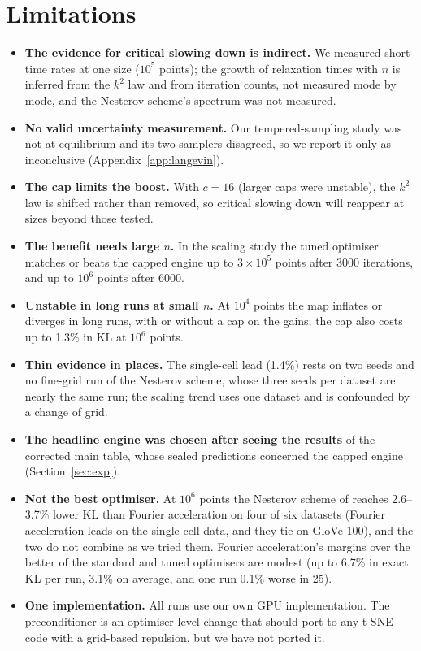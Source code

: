 \documentclass[11pt]{article}
\begin{document}
\section{Limitations}
\begin{itemize}
\item \textbf{The evidence for critical slowing down is indirect.} We measured short-time rates at one size
($10^5$ points); the growth of relaxation times with $n$ is inferred from the $k^2$ law and from iteration counts,
not measured mode by mode, and the Nesterov scheme's spectrum was not measured.
\item \textbf{No valid uncertainty measurement.} Our tempered-sampling study was not at equilibrium and its two
samplers disagreed, so we report it only as inconclusive (Appendix~\ref{app:langevin}).
\item \textbf{The cap limits the boost.} With $c=16$ (larger caps were unstable), the $k^2$ law is shifted
rather than removed, so critical slowing down will reappear at sizes beyond those tested.
\item \textbf{The benefit needs large $n$.} In the scaling study the tuned optimiser matches or beats the capped
engine up to $3\times10^5$ points after 3000 iterations, and up to $10^6$ points after 6000.
\item \textbf{Unstable in long runs at small $n$.} At $10^4$ points the map inflates or diverges in long runs, with
or without a cap on the gains; the cap also costs up to 1.3\% in KL at $10^6$ points.
\item \textbf{Thin evidence in places.} The single-cell lead (1.4\%) rests on two seeds and no fine-grid run of the
Nesterov scheme, whose three seeds per dataset are nearly the same run; the scaling trend uses one dataset and is
confounded by a change of grid.
\item \textbf{The headline engine was chosen after seeing the results} of the corrected main table, whose sealed
predictions concerned the capped engine (Section~\ref{sec:exp}).
\item \textbf{Not the best optimiser.} At $10^6$ points the Nesterov scheme of \citet{lambert2023nesterov} reaches
2.6--3.7\% lower KL than Fourier acceleration on four of six datasets (Fourier acceleration leads on the single-cell
data, and they tie on GloVe-100), and the two do not combine as we tried them.
Fourier acceleration's margins over the better of the standard and tuned optimisers are modest (up to 6.7\% in exact
KL per run, 3.1\% on average, and one run 0.1\% worse in 25).
\item \textbf{One implementation.} All runs use our own GPU implementation. The preconditioner is an
optimiser-level change that should port to any t-SNE code with a grid-based repulsion, but we have not
ported it.
\end{itemize}
\end{document}
